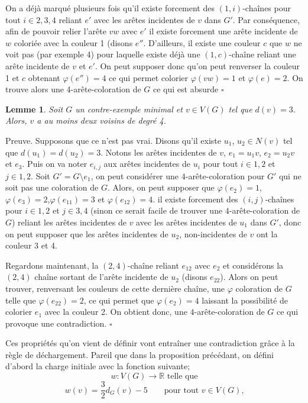 \documentclass[10pt,a4paper]{article}
\newtheorem{lemme}{Lemme}
\newcommand{\ep}{{\hfill $\square$}}
\begin{document}
On a déjà marqué plusieurs fois qu'il existe forcement des $(1,i)$-chaînes pour tout $i \in {2,3,4}$ reliant $e'$ avec les arêtes incidentes de $v$ dans $G'$. Par conséquence, afin de pouvoir relier l'arête $vw$ avec $e'$ il existe forcement une arête incidente de $w$ coloriée avec la couleur 1 (disons $e''$. D'ailleurs, il existe une couleur $c$ que $w$ ne voit pas (par exemple 4) pour laquelle existe déjà une $(1,c)$-chaîne reliant une arête incidente de $v$ et $e'$. On peut supposer donc qu'on peut renverser la couleur 1 et $c$ obtenant $\varphi(e'') = 4$ ce qui permet colorier $\varphi(vw) = 1$ et $\varphi(e) = 2$. On trouve alors une 4-arête-coloration de $G$ ce qui est absurde 
\ep

\begin{lemme}
Soit $G$ un contre-exemple minimal et $v \in V(G)$ tel que $d(v)=3$. Alors, $v$ a au moins deux voisins de degré 4.
\label{le:333}
\end{lemme}

Preuve.
Supposons que ce n'est pas vrai. Disons qu'il existe $u_1$, $u_2 \in N(v)$ tel que $d(u_1) = d(u_2) = 3$. Notons les arêtes incidentes de $v$, $e_1 = u_1v$, $e_2 = u_2v$ et $e_3$. Puis on va noter $e_{i,j}$ aux arêtes incidentes de $u_i$ pour tout $i \in {1,2}$ et $j \in {1,2}$. Soit $G' = G \setminus e_1$, on peut considérer une $4$-arête-coloration pour $G'$ qui ne soit pas une coloration de $G$. Alors, on peut supposer que  $\varphi(e_2)=1$, $\varphi(e_3)=2$,$\varphi(e_{11})=3$ et $\varphi(e_{12})=4$. il existe forcement des $(i,j)$-chaînes pour $i \in {1,2}$ et $j \in {3,4}$ (sinon ce serait facile de trouver une $4$-arête-coloration de $G$) reliant les arêtes incidentes de $v$ avec les arêtes incidentes de $u_1$ dans $G'$, donc on peut supposer que les arêtes incidentes de $u_2$, non-incidentes de $v$ ont la couleur 3 et 4. 

Regardons maintenant, la $(2,4)$-chaîne reliant $e_{12}$ avec $e_2$ et considérons la $(2,4)$ chaîne sortant de l'arête incidente de $u_2$ (disons $e_{22}$). Alors on peut trouver, renversant les couleurs de cette dernière chaîne, une $\varphi$ coloration de $G$ telle que $\varphi(e_{22}) = 2$, ce qui permet que $\varphi(e_2) = 4$ laissant la possibilité de colorier $e_1$ avec la couleur 2. On obtient donc, une $4$-arête-coloration de $G$ ce qui provoque une contradiction.
\ep


Ces propriétés qu'on vient de définir vont entraîner une contradiction grâce à la règle de déchargement. Pareil que dans la proposition précédant, on défini d'abord la charge initiale avec la fonction suivante;
$$w: V(G) \to \mathbb{R} \textrm{ telle que} $$
 $$w(v) = \frac{3}{2} d_G(v) - 5 \qquad \textrm{pour tout $v\in V(G)$,}$$
\end{document}
